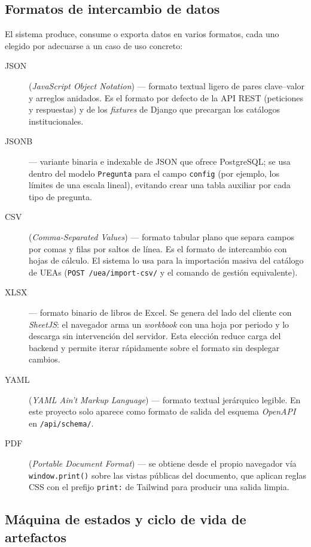 \subsection{Formatos de intercambio de datos}\label{subsec:formatos}

El sistema produce, consume o exporta datos en varios formatos, cada uno elegido por adecuarse a un caso de uso concreto:

\begin{description}
    \item[JSON] (\emph{JavaScript Object Notation}) --- formato textual ligero de pares clave--valor y arreglos anidados. Es el formato por defecto de la API REST (peticiones y respuestas) y de los \emph{fixtures} de Django que precargan los catálogos institucionales.
    \item[JSONB] --- variante binaria e indexable de JSON que ofrece PostgreSQL; se usa dentro del modelo \texttt{Pregunta} para el campo \texttt{config} (por ejemplo, los límites de una escala lineal), evitando crear una tabla auxiliar por cada tipo de pregunta.
    \item[CSV] (\emph{Comma-Separated Values}) --- formato tabular plano que separa campos por comas y filas por saltos de línea. Es el formato de intercambio con hojas de cálculo. El sistema lo usa para la importación masiva del catálogo de UEAs (\texttt{POST /uea/import-csv/} y el comando de gestión equivalente).
    \item[XLSX] --- formato binario de libros de Excel. Se genera del lado del cliente con \emph{SheetJS}: el navegador arma un \emph{workbook} con una hoja por periodo y lo descarga sin intervención del servidor. Esta elección reduce carga del backend y permite iterar rápidamente sobre el formato sin desplegar cambios.
    \item[YAML] (\emph{YAML Ain't Markup Language}) --- formato textual jerárquico legible. En este proyecto solo aparece como formato de salida del esquema \emph{OpenAPI} en \texttt{/api/schema/}.
    \item[PDF] (\emph{Portable Document Format}) --- se obtiene desde el propio navegador vía \texttt{window.print()} sobre las vistas públicas del documento, que aplican reglas CSS con el prefijo \texttt{print:} de Tailwind para producir una salida limpia.
\end{description}

\subsection{Máquina de estados y ciclo de vida de artefactos}\label{subsec:state-machine}

